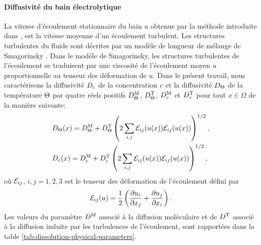 \paragraph{Diffusivité du bain électrolytique} La vitesse d'écoulement
stationnaire du bain $u$ obtenue par la méthode introduite dans
\cite{Steiner2009}, \cite{Rochat2016} est la vitesse moyenne d'un
écoulement turbulent. Les structures turbulentes du fluide sont
décrites par un modèle de longueur de mélange de Smagorinsky
\cite{Rochat2016}. Dans le modèle de Smagorinsky, les structures
turbulentes de l'écoulement se traduisent par une viscosité de
l'écoulement moyen $u$ proportionnelle au tenseur des déformation de
$u$. Dans le présent travail, nous caractérisons la diffusivité
$D_{c}$ de la concentration $c$ et la
diffusivité $D_\Theta$ de la température $\Theta$ par
quatre réels positifs $D^{\mathrm M}_\Theta$, $D^{\mathrm T}_\Theta$,
$D^{\mathrm M}_c$ et $D^{\mathrm T}_c$ pour tout
$x\in\Omega$ de la manière suivante:
\begin{align}
  &D_\Theta(x) = D^{\mathrm M}_\Theta +
  D^{\mathrm T}_\Theta\left( 2\sum_{i,j}\mathcal E_{ij}(u(x))\mathcal E_{ij}(u(x)) \right)^{1/2},\\
  &D_{c}(x) = D^{\mathrm M}_c +
  D^{\mathrm T}_c\left( 2\sum_{i,j}\mathcal E_{ij}(u(x))\mathcal E_{ij}(u(x)) \right)^{1/2},
\end{align}
où $\mathcal E_{ij}$, $i, j = 1,2,3$ est le tenseur des déformation
de l'écoulement défini par
\begin{equation}
  \mathcal E_{ij}(u) = \frac{1}{2}\left( \frac{\partial u_i}{\partial
      x_j} + \frac{\partial u_j}{\partial x_i} \right).
\end{equation}
Les valeurs du paramètre $D^{\mathrm M}$ associé à la diffusion
moléculaire et de $D^{\mathrm T}$ associé à la diffusion
induite par les turbulences de l'écoulement, sont rapportées dans la
table \ref{tab:dissolution-physical-parameters}.


